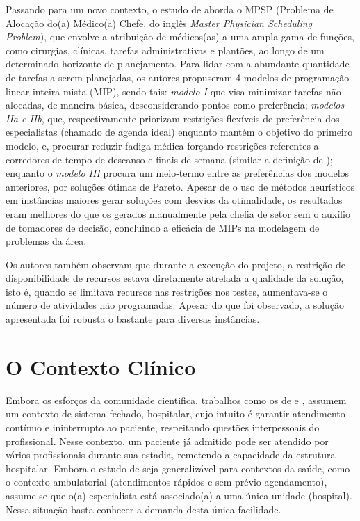 Passando para um novo contexto, o estudo de  aborda o MPSP (Problema de Alocação do(a) Médico(a) Chefe, do inglês \textit{Master Physician Scheduling Problem}), que envolve a atribuição de médicos(as) a uma ampla gama de funções, como cirurgias, clínicas, tarefas administrativas e plantões, ao longo de um determinado horizonte de planejamento.
Para lidar com a abundante quantidade de tarefas a serem planejadas, os autores propuseram 4 modelos de programação linear inteira mista (MIP), sendo tais: \textit{modelo I} que visa minimizar tarefas não-alocadas, de maneira básica, desconsiderando pontos como preferência; \textit{modelos IIa e IIb}, que, respectivamente priorizam restrições flexíveis de preferência dos especialistas (chamado de agenda ideal) enquanto mantém o objetivo do primeiro modelo, e, procurar reduzir fadiga médica forçando restrições referentes a corredores de tempo de descanso e finais de semana (similar a definição de ); enquanto o \textit{modelo III} procura um meio-termo entre as preferências dos modelos anteriores, por soluções ótimas de Pareto. Apesar de o uso de métodos heurísticos em instâncias maiores gerar soluções com desvios da otimalidade, os resultados eram melhores do que os gerados manualmente pela chefia de setor sem o auxílio de tomadores de decisão, concluindo a eficácia de MIPs na modelagem de problemas da área.

Os autores também observam que durante a execução do projeto, a restrição de disponibilidade de recursos estava diretamente atrelada a qualidade da solução, isto é, quando se limitava recursos nas restrições nos testes, aumentava-se o número de atividades não programadas. Apesar do que foi observado, a solução apresentada foi robusta o bastante para diversas instâncias.

\section{O Contexto Clínico}
\label{2rev-sec2}

Embora os esforços da comunidade cientifica, trabalhos como os de  e , assumem um contexto de sistema fechado, hospitalar, cujo intuito é garantir atendimento contínuo e ininterrupto ao paciente, respeitando questões interpessoais do profissional. Nesse contexto, um paciente já admitido pode ser atendido por vários profissionais durante sua estadia, remetendo a capacidade da estrutura hospitalar. Embora o estudo de  seja generalizável para contextos da saúde, como o contexto ambulatorial (atendimentos rápidos e sem prévio agendamento), assume-se que o(a) especialista está associado(a) a uma única unidade (hospital). Nessa situação basta conhecer a demanda desta única facilidade.

